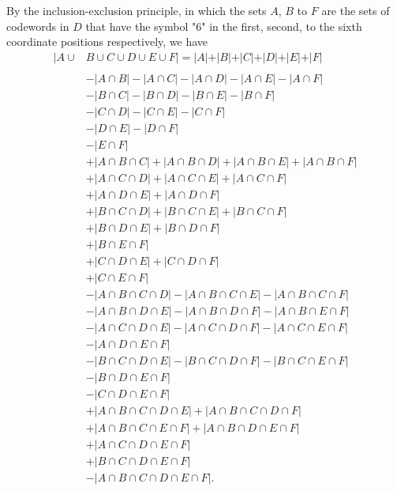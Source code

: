 By the inclusion-exclusion principle, in which the sets $A$, $B$ to $F$ are the sets of codewords in $D$ that have the symbol "6" in the first, second, to the sixth coordinate positions respectively, we have
\begin{align*}
	|A \cup &B \cup C \cup D \cup E \cup F | =
	|A| + |B| + |C| + |D|+ |E|+ |F|\\\\
	&-|A \cap B|
	 -|A \cap C|
	 -|A \cap D|
	 -|A \cap E|
	 -|A \cap F|\\
	&-|B \cap C|
	 -|B \cap D|
	 -|B \cap E|
	 -|B \cap F|\\
	&-|C \cap D|
	 -|C \cap E|
	 -|C \cap F|\\
	&-|D \cap E|
	 -|D \cap F|\\
	&-|E \cap F|\\
	&+|A\cap B\cap C|
	 +|A\cap B\cap D|
	 +|A\cap B\cap E|
	 +|A\cap B\cap F|\\
	&+|A\cap C \cap D|
	 +|A\cap C \cap E|
	 +|A\cap C \cap F|\\
	&+|A\cap D \cap E|
	 +|A\cap D \cap F|\\
	&+|B\cap C\cap D|
	 +|B\cap C\cap E|
	 +|B\cap C\cap F|\\
	&+|B\cap D\cap E|
	 +|B\cap D\cap F|\\
	&+|B\cap E\cap F|\\
	&+|C\cap D\cap E|
	 +|C\cap D\cap F|\\
	&+|C\cap E\cap F|\\
	&-|A\cap B\cap C\cap D|
	 -|A\cap B\cap C\cap E|
	 -|A\cap B\cap C\cap F|\\
	&-|A\cap B\cap D\cap E|
	 -|A\cap B\cap D\cap F|
	 -|A\cap B\cap E\cap F|\\
	&-|A\cap C\cap D\cap E|
	 -|A\cap C\cap D\cap F|
	 -|A\cap C\cap E\cap F|\\
	&-|A\cap D\cap E\cap F|\\
	&-|B\cap C\cap D\cap E|
	 -|B\cap C\cap D\cap F|
	 -|B\cap C\cap E\cap F|\\
	&-|B\cap D\cap E\cap F|\\
	&-|C\cap D\cap E\cap F|\\
	&+|A\cap B\cap C\cap D\cap E|
	 +|A\cap B\cap C\cap D\cap F|\\
	&+|A\cap B\cap C\cap E\cap F|
	+|A\cap B\cap D\cap E\cap F|\\
	&+|A\cap C\cap D\cap E\cap F|\\
	&+|B\cap C\cap D\cap E\cap F|\\
	&-|A\cap B\cap C\cap D\cap E\cap F|.
\end{align*}
